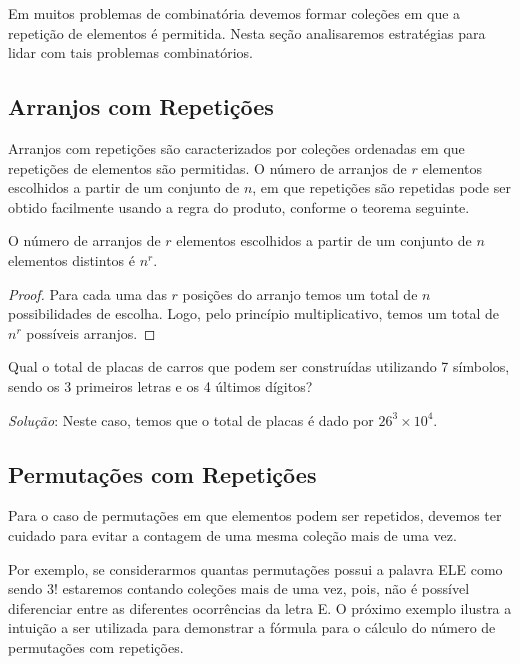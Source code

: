 Em muitos problemas de combinatória devemos formar coleções em que a
repetição de elementos é permitida. Nesta seção analisaremos
estratégias para lidar com tais problemas combinatórios.

\subsection{Arranjos com Repetições}

Arranjos com repetições são caracterizados por coleções ordenadas em
que repetições de elementos são permitidas. O número de arranjos de
$r$ elementos escolhidos a partir de um conjunto de $n$, em que
repetições são repetidas pode ser obtido facilmente usando a regra do
produto, conforme o teorema seguinte.

\begin{Theorem}
O número de arranjos de $r$ elementos escolhidos a partir
de um conjunto de $n$ elementos distintos é $n^r$.
\end{Theorem}
\begin{proof}
Para cada uma das $r$ posições do arranjo temos um total de $n$
possibilidades de escolha. Logo, pelo princípio multiplicativo, temos
um total de $n^r$ possíveis arranjos.
\end{proof}

\begin{Example}
Qual o total de placas de carros que podem ser construídas utilizando
7 símbolos, sendo os 3 primeiros letras e os 4 últimos dígitos?

\textit{Solução}: Neste caso, temos que o total de placas é dado por
$26^3 \times 10^4$.
\end{Example}

\subsection{Permutações com Repetições}

Para o caso de permutações em que elementos podem ser repetidos,
devemos ter cuidado para evitar a contagem de uma mesma coleção mais
de uma vez.

Por exemplo, se considerarmos quantas permutações possui a palavra ELE
como sendo $3!$ estaremos contando coleções mais de uma vez, pois, não
é possível diferenciar entre as diferentes ocorrências da letra E. O
próximo exemplo ilustra a intuição a ser utilizada para demonstrar a
fórmula para o cálculo do número de permutações com repetições.

